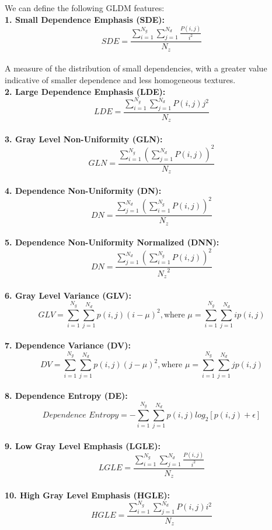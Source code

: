 We can define the following GLDM features:\\
\textbf{1. Small Dependence Emphasis (SDE):}\\
\[SDE=\frac{\sum _{i=1}^{N_{g}}\sum _{j=1}^{N_{d}}\frac{P\left(i,j\right)}{i^{2}}}{N_{z}}\]\\
A measure of the distribution of small dependencies, with a greater value indicative of smaller dependence and less homogeneous textures.\\
\textbf{2. Large Dependence Emphasis (LDE):}\\
\[LDE=\frac{\sum _{i=1}^{N_{g}}\sum _{j=1}^{N_{d}}P\left(i,j\right)j^{2}}{N_{z}}\]\\
\textbf{3. Gray Level Non-Uniformity (GLN):}\\
\[GLN=\frac{\sum _{i=1}^{N_{g}}\left(\sum _{j=1}^{N_{d}}P\left(i,j\right)\right)^{2}}{N_{z}}\]\\
\textbf{4. Dependence Non-Uniformity (DN):}\\
\[DN=\frac{\sum _{j=1}^{N_{d}}\left(\sum _{i=1}^{N_{g}}P\left(i,j\right)\right)^{2}}{N_{z}}\]\\
\textbf{5. Dependence Non-Uniformity Normalized (DNN):}\\
\[DN=\frac{\sum _{j=1}^{N_{d}}\left(\sum _{i=1}^{N_{g}}P\left(i,j\right)\right)^{2}}{{N_{z}}^{2}}\]\\
\textbf{6. Gray Level Variance (GLV):}\\
\[GLV=\sum _{i=1}^{N_{g}}\sum _{j=1}^{N_{d}}p\left(i,j\right)\left(i-\mu \right)^{2},\text{where } \mu =\sum _{i=1}^{N_{g}}\sum _{j=1}^{N_{d}}ip\left(i,j\right)\]\\
\textbf{7. Dependence Variance (DV):}\\
\[DV=\sum _{i=1}^{N_{g}}\sum _{j=1}^{N_{d}}p\left(i,j\right)\left(j-\mu \right)^{2},\text{where } \mu =\sum _{i=1}^{N_{g}}\sum _{j=1}^{N_{d}}jp\left(i,j\right)\]\\
\textbf{8. Dependence Entropy (DE):}\\
\[\textit{Dependence Entropy}=-\sum _{i=1}^{N_{g}}\sum _{j=1}^{N_{d}}p\left(i,j\right)log_{2}\left[p\left(i,j\right)+\epsilon \right]\]\\
\textbf{9. Low Gray Level Emphasis (LGLE):}\\
\[LGLE=\frac{\sum _{i=1}^{N_{g}}\sum _{j=1}^{N_{d}}\frac{P\left(i,j\right)}{i^{2}}}{N_{z}}\]\\
\textbf{10. High Gray Level Emphasis (HGLE):}\\
\[HGLE=\frac{\sum _{i=1}^{N_{g}}\sum _{j=1}^{N_{d}}P\left(i,j\right)i^{2}}{N_{z}}\]\\
